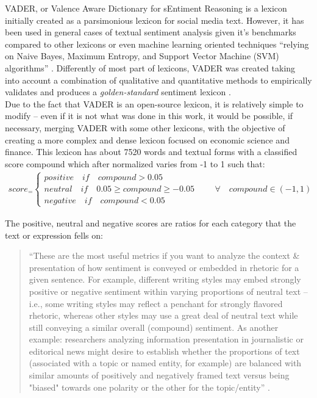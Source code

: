 VADER, or Valence Aware Dictionary for sEntiment Reasoning is a lexicon initially created as a parsimonious lexicon for social media text. However, it has been used in general cases of textual sentiment analysis given it's benchmarks compared to other lexicons or even machine learning oriented techniques ``relying on Naive Bayes, Maximum Entropy, and Support Vector Machine (SVM) algorithms'' \citep[p.216]{hutto2014vader}. Differently of most part of lexicons, VADER was created taking into account a combination of qualitative and quantitative methods to empirically validates and produces a \textit{golden-standard} sentiment lexicon \cite{hutto2014vader}.\\

Due to the fact that VADER is an open-source lexicon, it is relatively simple to modify -- even if it is not what was done in this work, it would be possible, if necessary, merging VADER with some other lexicons, with the objective of creating a more complex and dense lexicon focused on economic science and finance. This lexicon has about 7520 words and textual forms with a classified score compound which after normalized varies from -1 to 1 such that:
\begin{align} \label{eq:vaadercoumpond}
    score_ = \begin{cases}
                positive\quad if \quad compound > 0.05\\
                neutral\quad if \quad 0.05 \geq compound \geq -0.05\\
                negative\quad if \quad compound < 0.05
              \end{cases} \qquad \forall\quad compound \in (-1, 1)
\end{align}

The positive, neutral and negative scores are ratios for each category that the text or expression fells on: 
\begin{quote}
    ``These are the most useful metrics if you want to analyze the context \& presentation of how sentiment is conveyed or embedded in rhetoric for a given sentence. For example, different writing styles may embed strongly positive or negative sentiment within varying proportions of neutral text -- i.e., some writing styles may reflect a penchant for strongly flavored rhetoric, whereas other styles may use a great deal of neutral text while still conveying a similar overall (compound) sentiment. As another example: researchers analyzing information presentation in journalistic or editorical news might desire to establish whether the proportions of text (associated with a topic or named entity, for example) are balanced with similar amounts of positively and negatively framed text versus being "biased" towards one polarity or the other for the topic/entity'' \cite{vadergit}.
\end{quote}

